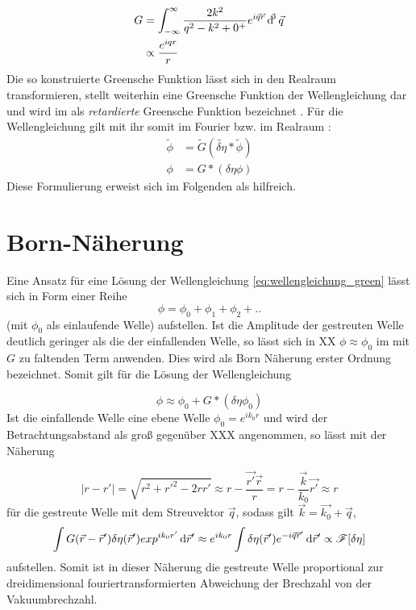 \begin{align}
G&=\int_{-\infty}^{\infty} \frac{2k^2}{q^2-k^2+0^+} e^{i\vec{q}\vec{r}}\dif^3 \vec{q}\nonumber\\
&\propto\frac{e^{iqr}}{r}
\end{align}
Die so konstruierte Greensche Funktion lässt sich in den Realraum transformieren, stellt weiterhin eine Greensche Funktion der Wellengleichung dar und wird im als \textit{retardierte} Greensche Funktion bezeichnet \cite{trigg2006}. Für die Wellengleichung gilt mit ihr somit im Fourier bzw. im Realraum \cite{cowley1995,thibault2007}:
\begin{align}
\label{eq:wellengleichung_green}
\tilde{\phi}&=\tilde{G}(\tilde{\delta \eta} \ast \tilde{\phi})\\
\phi&={G}\ast({\delta \eta}  {\phi})
\end{align}
Diese Formulierung erweist sich im Folgenden als hilfreich.
\section{Born-Näherung}
Eine Ansatz für eine Lösung der Wellengleichung \eqref{eq:wellengleichung_green} lässt sich in Form einer Reihe
\begin{equation}
\phi=\phi_0+\phi_1+\phi_2+..
\end{equation}
(mit $\phi_0$ als einlaufende Welle) aufstellen. Ist die Amplitude der gestreuten Welle deutlich geringer als die der einfallenden Welle, so lässt sich in XX $\phi\approx\phi_0$ im mit $G$ zu faltenden Term anwenden. Dies wird als Born Näherung erster Ordnung bezeichnet. Somit gilt für die Lösung der Wellengleichung

\begin{equation}
\phi\approx\phi_0+G\ast({\delta \eta} \phi_0)
\end{equation}
Ist die einfallende Welle eine ebene Welle $\phi_0=e^{ik_0r}$ und wird der Betrachtungsabstand als groß gegenüber XXX angenommen, so lässt mit der Näherung

\begin{equation}
|r-r'|=\sqrt{r^2+r'^2-2rr'}\approx r-\frac{\vec{r'}\vec{r}}{r}=r-\frac{\vec{k}}{k_0}\vec{r'}\approx r
\end{equation}
für die gestreute Welle mit dem Streuvektor $\vec{q}$, sodass gilt $\vec{k}=\vec{k_0}+\vec{q}$,
\begin{equation}
\label{eq:born}
\int G(\vec{r}-\vec{r}')\delta\eta(\vec{r}') exp^{ik_0r'}  \dif \vec{r}'\approx e^{ik_0r}\int \delta\eta(\vec{r}')e^{-i\vec{q}\vec{r}'}\dif \vec{r}'\propto \mathscr{F}[\delta\eta]
\end{equation}
aufstellen. Somit ist in dieser Näherung die gestreute Welle proportional zur dreidimensional fouriertransformierten Abweichung der Brechzahl von der Vakuumbrechzahl.





